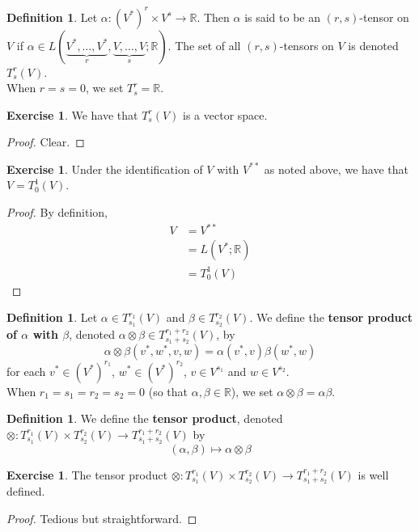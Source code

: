 \documentclass[12pt]{amsart}
\theoremstyle{definition}
\newtheorem{defn}[definition]{Definition}
\newtheorem{ex}[definition]{Exercise}
\newcommand{\al}{\alpha}
\newcommand{\bet}{\beta}
\newcommand{\R}{\mathbb{R}}
\newcommand{\Tn}[1]{T^{r_{#1}}_{s_{#1}}(V)}
\newcommand{\Tnp}{T^{r_1 + r_2}_{s_1 + s_2}(V)}
\begin{document}
	\begin{defn}
	Let $\al: (V^*)^r \times V^s \rightarrow \R$. Then $\al$ is said to be an $(r,s)$-tensor on $V$ if $\al \in L(\underbrace{V^*, \dots, V^*}_{r}, \underbrace{V, \dots, V}_{s}; \R)$. The set of all $(r,s)$-tensors on $V$ is denoted $T^r_s(V)$. \\
	When $r=s=0$, we set $T^r_s = \R$.
	\end{defn}
	
	\begin{ex}
		We have that $T^r_s(V)$ is a vector space. 
	\end{ex}

	\begin{proof}
		Clear.
	\end{proof}
	
	\begin{ex}
	Under the identification of $V$ with $V^{**}$ as noted above, we have that $V = T^1_0(V)$. 
	\end{ex}
	
	\begin{proof}
	By definition,
	\begin{align*}
	V 
	&= V^{**} \\
	&= L(V^*; \R) \\
	&= T^1_0(V)
	\end{align*}
	\end{proof}
	
	\begin{defn}
	Let $\al \in \Tn{1}$ and $\bet \in \Tn{2}$. We define the \textbf{tensor product of $\al$ with $\bet$}, denoted $\al \otimes \beta \in T^{r_1+r_2}_{s_1+s_2}(V)$, by $$\al \otimes \bet (v^*, w^*, v, w) = \al(v^*, v) \bet(w^*, w)$$ for each $v^* \in (V^*)^{r_1}$, $w^* \in (V^*)^{r_2}$, $v \in V^{s_1}$ and $w \in V^{s_2}$.\\
	When $r_1=s_1=r_2=s_2= 0$ (so that $\al, \bet \in \R$), we set $\al \otimes \bet = \al \bet$.
	\end{defn}
	
	\begin{defn}
	We define the \textbf{tensor product}, denoted $\otimes : \Tn{1} \times  \Tn{2} \rightarrow \Tnp$ by $$(\al, \bet) \mapsto \al \otimes \beta $$   
	\end{defn}
	
	\begin{ex}
	The tensor product $\otimes : \Tn{1} \times  \Tn{2} \rightarrow \Tnp$ is well defined. 
	\end{ex}
	
	\begin{proof}
	Tedious but straightforward.
\end{proof}	
	
\end{document}
